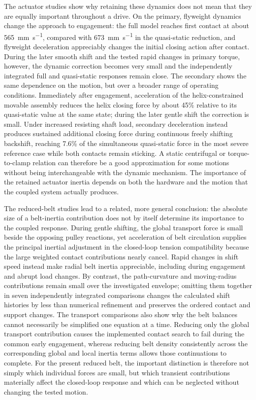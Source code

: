 \documentclass[11pt]{report}
\numberwithin{equation}{section}
\begin{document}
The actuator studies show why retaining these dynamics does not mean that they are equally
important throughout a drive. On the primary, flyweight dynamics change the approach to
engagement: the full model reaches first contact at about
\SI{565}{\milli\metre\per\second}, compared with
\SI{673}{\milli\metre\per\second} in the quasi-static reduction, and flyweight
deceleration appreciably changes the initial closing action after contact. During the later
smooth shift and the tested rapid changes in primary torque, however, the dynamic correction
becomes very small and the independently integrated full and quasi-static responses remain
close. The secondary shows the same dependence on the motion, but over a broader range of
operating conditions. Immediately after engagement, acceleration of the helix-constrained
movable assembly reduces the helix closing force by about 45\% relative to its quasi-static
value at the same state; during the later gentle shift the correction is small. Under
increased resisting shaft load, secondary deceleration instead produces sustained additional
closing force during continuous freely shifting backshift, reaching 7.6\% of the simultaneous
quasi-static force in the most severe reference case while both contacts remain sticking.
A static centrifugal or torque-to-clamp relation can therefore be a good approximation for
some motions without being interchangeable with the dynamic mechanism. The importance of the
retained actuator inertia depends on both the hardware and the motion that the coupled system
actually produces.

The reduced-belt studies lead to a related, more general conclusion: the absolute size of a
belt-inertia contribution does not by itself determine its importance to the coupled response.
During gentle shifting, the global transport force is small beside the opposing pulley
reactions, yet acceleration of belt circulation supplies the principal inertial adjustment
in the closed-loop tension compatibility because the large weighted contact contributions
nearly cancel. Rapid changes in shift speed instead make radial belt inertia appreciable,
including during engagement and abrupt load changes. By contrast, the path-curvature and
moving-radius contributions remain small over the investigated envelope; omitting them
together in seven independently integrated comparisons changes the calculated shift histories
by less than numerical refinement and preserves the ordered contact and support changes.
The transport comparisons also show why the belt balances cannot necessarily be simplified
one equation at a time. Reducing only the global transport contribution causes the implemented
contact search to fail during the common early engagement, whereas reducing belt density
consistently across the corresponding global and local inertia terms allows those continuations
to complete. For the present reduced belt, the important distinction is therefore not simply
which individual forces are small, but which transient contributions materially affect the
closed-loop response and which can be neglected without changing the tested motion.
\end{document}
